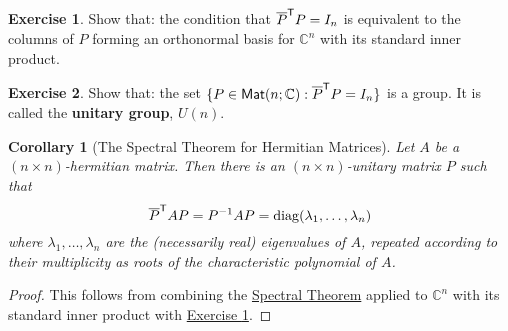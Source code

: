 \documentclass[11pt]{amsbook}
\newtheorem{corollary}[theorem]{Corollary}
\theoremstyle{definition}
\newtheorem{exercise}{Exercise}
\begin{document}
\begin{exercise}\label{orthmat2}
Show that: the condition that $\overline{P}^{\sf T}P = I_n$ is equivalent to the columns of $P$ forming an orthonormal basis for $\mathbb{C}^n$ with its standard inner product.
\end{exercise}

\begin{exercise}
Show that: the set $\{ P\in {\sf Mat}(n;\mathbb{C}) : \overline{P}^{\sf T}P = I_n \}$ is a group. It is called the {\bf unitary group}, $U(n)$.
\end{exercise}

\begin{corollary}[The Spectral Theorem for Hermitian Matrices] Let $A$ be a $(n\times n)$-hermitian matrix. Then there is an $(n\times n)$-unitary matrix $P$ such that $$\overline{P}^{\sf T}AP = P^{-1}AP = {\rm diag} (\lambda_1, \ldots , \lambda_n)$$ where $\lambda_1, \ldots , \lambda_n$ are the (necessarily real) eigenvalues of $A$, repeated according to their multiplicity as roots of the characteristic polynomial of $A$.
\end{corollary}

\begin{proof} This follows from combining the \hyperref[spectral]{Spectral Theorem} applied to $\mathbb{C}^n$ with its standard inner product with \hyperref[orthmat2]{Exercise \ref{orthmat2}}.
\end{proof}
\end{document}
